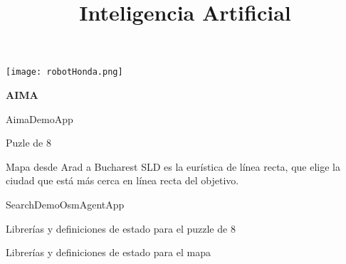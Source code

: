 \documentclass[spanish, a4paper, 12pt]{article} 	%
\begin{document}
\title{\textbf{Inteligencia Artificial}}
\maketitle

\begin{center}
{\texttt{[image: robotHonda.png]}}
\end{center}

\newpage
\textbf{{AIMA}}


\begin{section}{AimaDemoApp }


\end{section}

\newpage
\begin{section}{Puzle de 8}

	
\end{section}

\begin{section}{Mapa desde Arad a Bucharest}
SLD es la eurística de línea recta, que elige la ciudad que está más cerca en línea recta del objetivo.

\end{section}


\begin{section}{SearchDemoOsmAgentApp }


\end{section}


\begin{section}{Librerías y definiciones de estado para el puzzle de 8 }


\end{section}


\begin{section}{Librerías y definiciones de estado para el mapa }


\end{section}
\end{document}
